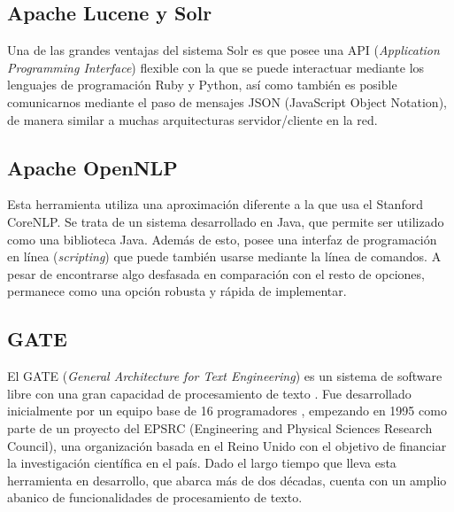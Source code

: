 \subsection{Apache Lucene y Solr}

Una de las grandes ventajas del sistema Solr es que posee una API (\textit{Application Programming Interface}) flexible con la que se puede interactuar mediante los lenguajes de programación Ruby y Python, así como también es posible comunicarnos mediante el paso de mensajes JSON (JavaScript Object Notation), de manera similar a muchas arquitecturas servidor/cliente en la red.

\subsection{Apache OpenNLP}

Esta herramienta utiliza una aproximación diferente a la que usa el Stanford CoreNLP.
%
Se trata de un sistema desarrollado en Java, que permite ser utilizado como una biblioteca Java. Además de esto, posee una interfaz de programación en línea (\textit{scripting}) que puede también usarse mediante la línea de comandos.
%
A pesar de encontrarse algo desfasada en comparación con el resto de opciones, permanece como una opción robusta y rápida de implementar.




\subsection{GATE}

El GATE (\textit{General Architecture for Text Engineering}) es un sistema de software libre con una gran capacidad de procesamiento de texto \cite{gate}.
%
Fue desarrollado inicialmente por un equipo base de 16 programadores \cite{gate_about}, empezando en 1995 como parte de un proyecto del EPSRC (Engineering and Physical Sciences Research Council), una organización basada en el Reino Unido con el objetivo de financiar la investigación científica en el país.
%
Dado el largo tiempo que lleva esta herramienta en desarrollo, que abarca más de dos décadas, cuenta con un amplio abanico de funcionalidades de procesamiento de texto.

